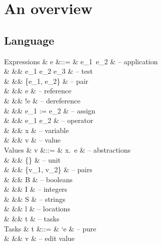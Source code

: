 
\newpage
\section{An overview}

\statefultrue


\subsection{Language}

\begin{grammar}
  Expressions
    & e      &::= & e_1\ e_2                    & – application \\
    &        &\mid& \If e_1 \Then e_2 \Else e_3 & – test \\
    &        &\mid& \{e_1, e_2\}                & – pair \\
    &        &\mid& \Ref e                      & – reference \\
    &        &\mid& !e                          & – dereference \\
    &        &\mid& e_1 := e_2                  & – assign \\
    &        &\mid& e_1 \star e_2               & – operator \\
    &        &\mid& x                           & – variable \\
    &        &\mid& v                           & – value \\
  Values
    & v      &::= & \lambda x.\ e               & – abstractions \\
    &        &\mid& \{\}                        & – unit \\
    &        &\mid& \{v_1, v_2\}                & – pairs \\
    &        &\mid& B \in \BB                   & – booleans \\
    &        &\mid& I \in \ZZ                   & – integers \\
    &        &\mid& S \in \SS                   & – strings \\
    &        &\mid& l                           & – locations \\
    &        &\mid& t                           & – tasks \\
  Tasks
    & t      &::= & `e                          & – pure \\
    &        &\mid& \Edit v                     & – edit value \\

\end{grammar}
